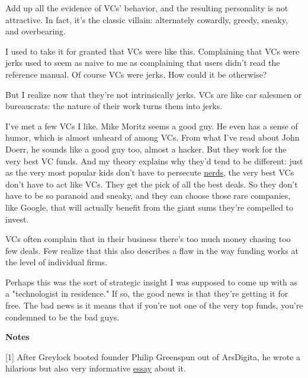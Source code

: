Add up all the evidence of
                  VCs' behavior, and the resulting personality is not
                  attractive. In fact, it's the classic villain: alternately
                  cowardly, greedy, sneaky, and overbearing.

I used
                  to take it for granted that VCs were like this. Complaining
                  that VCs were jerks used to seem as naive to me as complaining
                  that users didn't read the reference manual. Of course VCs
                  were jerks. How could it be otherwise?

But I
                  realize now that they're not intrinsically jerks. VCs are like
                  car salesmen or bureaucrats: the nature of their work turns
                  them into jerks.

I've met a few VCs I like. Mike
                  Moritz seems a good guy. He even has a sense of humor, which
                  is almost unheard of among VCs. From what I've read about John
                  Doerr, he sounds like a good guy too, almost a hacker. But
                  they work for the very best VC funds. And my theory explains
                  why they'd tend to be different: just as the very most popular
                  kids don't have to persecute \href{http://www.paulgraham.com/nerds.html}{nerds},
                  the very best VCs don't have to act like VCs. They get the
                  pick of all the best deals. So they don't have to be so
                  paranoid and sneaky, and they can choose those rare companies,
                  like Google, that will actually benefit from the giant sums
                  they're compelled to invest.

VCs often complain
                  that in their business there's too much money chasing too few
                  deals. Few realize that this also describes a flaw in the way
                  funding works at the level of individual firms.

Perhaps
                  this was the sort of strategic insight I was supposed to come
                  up with as a "technologist in residence." If so, the good news
                  is that they're getting it for free. The bad news is it means
                  that if you're not one of the very top funds, you're condemned
                  to be the bad guys.



\textbf{Notes}

[1] After Greylock booted founder Philip
                  Greenspun out of ArsDigita, he wrote a hilarious but also very
                  informative
                  \href{http://www.waxy.org/random/arsdigita/}{essay}
                  about it.
                  


